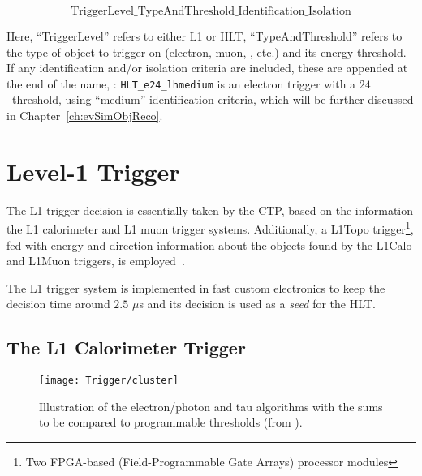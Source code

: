 		$$\mathrm{TriggerLevel\_TypeAndThreshold\_Identification\_Isolation}$$

		\noindent Here, ``TriggerLevel'' refers to either \ac{L1} or \ac{HLT}, ``TypeAndThreshold'' refers to the type of object to trigger on (electron, muon, \met, etc.) and its energy threshold. If any identification and/or isolation criteria are included, these are appended at the end of the name, \eg: \texttt{HLT\_e24\_lhmedium} is an electron trigger with a $24$ \GeV\ threshold, using ``medium'' identification criteria, which will be further discussed in Chapter~\ref{ch:evSimObjReco}. 



		
	\section{Level-1 Trigger}
	\label{sec:L1}

		The \ac{L1} trigger decision is essentially taken by the \ac{CTP}, based on the information the \ac{L1} calorimeter and \ac{L1} muon trigger systems. Additionally, a \ac{L1Topo} trigger\footnote{Two FPGA-based (Field-Programmable Gate Arrays) processor modules}, fed with energy and direction information about the objects found by the \ac{L1Calo} and \ac{L1Muon} triggers, is employed~\cite{ATLASJINST,ATLASTrigger2015,ATLASL1Topo}.

		The \ac{L1} trigger system is implemented in fast custom electronics to keep the decision time around $2.5$ $\mu$s and its decision is used as a \emph{seed} for the \ac{HLT}. 


		\subsection*{The L1 Calorimeter Trigger}

			\begin{wrapfigure}{L}{.5\textwidth}
				\centering
				\texttt{[image: Trigger/cluster]}
				\caption{\label{fig:calo_cluster} Illustration of the electron/photon and tau algorithms with the sums to be compared to programmable thresholds (from \cite{ATLASTrigger2010}).}
			\end{wrapfigure}

